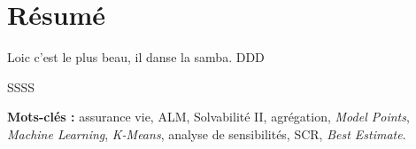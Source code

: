 \chapter*{Résumé}
Loic c'est le plus beau, il danse la samba. DDD

SSSS



\vspace{0.5cm}
\noindent \textbf{Mots-clés :} assurance vie, ALM, Solvabilité II, agrégation, \textit{Model Points}, \textit{Machine Learning}, \textit{K-Means}, analyse de sensibilités, SCR, \textit{Best Estimate}.